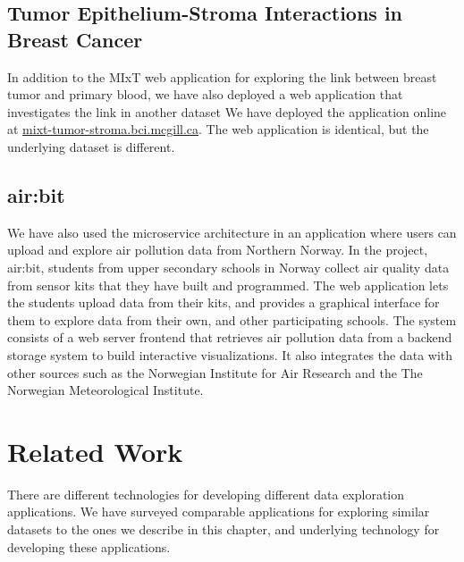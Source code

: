 \subsection{Tumor Epithelium-Stroma Interactions in Breast Cancer}
In addition to the MIxT web application for exploring the link between breast
tumor and primary blood, we have also deployed a web application that
investigates the link in another dataset\cite{boersma2008stromal} We have
deployed the application online at \url{mixt-tumor-stroma.bci.mcgill.ca}. The
web application is identical, but the underlying dataset is different.

\subsection{air:bit}
We have also used the microservice architecture in an application where users
can upload and explore air pollution data from Northern
Norway.\cite{fjukstad2018low} In the project, air:bit, students from upper
secondary schools in Norway collect air quality data from sensor kits that they
have built and programmed. The web application lets the students upload data
from their kits, and provides a graphical interface for them to explore data
from their own, and other participating schools. The system consists of a web
server frontend that retrieves air pollution data from a backend storage system
to build interactive visualizations. It also integrates the data with other
sources such as the Norwegian Institute for Air Research and the The Norwegian
Meteorological Institute. 

    
\section{Related Work}\label{sec:int:rel}
There are different technologies for developing different data exploration
applications. We have surveyed comparable applications for exploring similar
datasets to the ones we describe in this chapter, and underlying technology for
developing these applications. 

